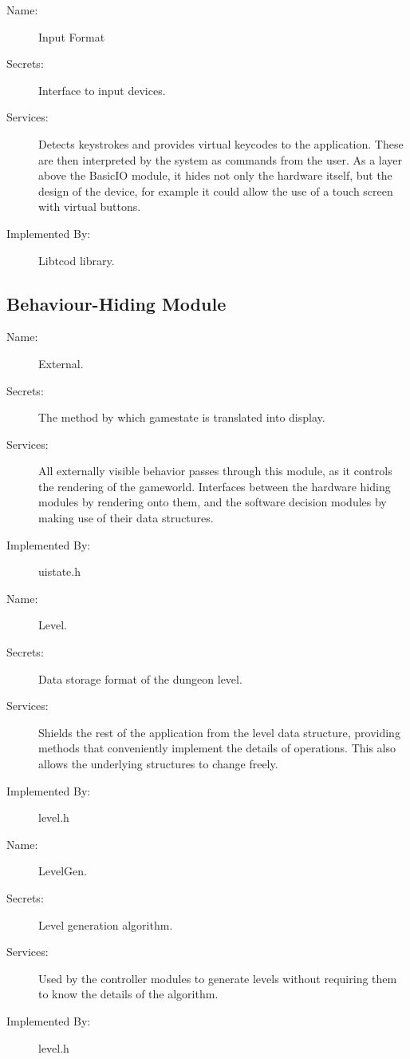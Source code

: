 \documentclass[12pt, titlepage]{article}
\begin{document}
        \bigskip\begin{description}
            \item[Name:]Input Format
            \item[Secrets:]Interface to input devices.
            \item[Services:]Detects keystrokes and provides virtual keycodes to the application. These are then interpreted by              the system as commands from the user. As a layer above the BasicIO module, it hides not only the hardware itself,
            but the design of the device, for example it could allow the use of a touch screen with virtual buttons.
            \item[Implemented By:]Libtcod library.
        \end{description}

    \subsection{Behaviour-Hiding Module}

        \bigskip\begin{description}
            \item[Name:]External.
            \item[Secrets:]The method by which gamestate is translated into display.
            \item[Services:]All externally visible behavior passes through this module, as it controls the rendering of the gameworld. Interfaces between the hardware hiding modules by rendering onto them, and the software decision modules by making use of their data structures.
            \item[Implemented By:]uistate.h
        \end{description}

        \bigskip\begin{description}
            \item[Name:]Level.
            \item[Secrets:]Data storage format of the dungeon level.
            \item[Services:]Shields the rest of the application from the level data structure, providing methods that conveniently implement the details of operations. This also allows the underlying structures to change freely.
            \item[Implemented By:]level.h
        \end{description}

        \bigskip\begin{description}
            \item[Name:]LevelGen.
            \item[Secrets:]Level generation algorithm.
            \item[Services:]Used by the controller modules to generate levels without requiring them to know the details of the algorithm.
            \item[Implemented By:]level.h
        \end{description}
\end{document}

